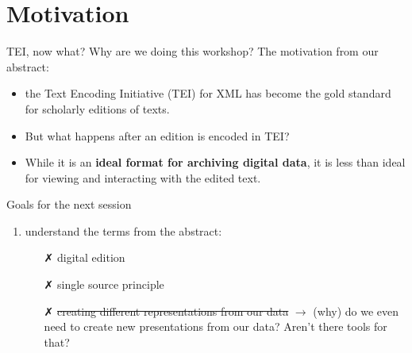 
\section{Motivation}

\begin{frame}{TEI, now what?}
    Why are we doing this workshop? The motivation from our abstract:
    \begin{itemize}
        \item \punkti the Text Encoding Initiative (TEI) for XML has become the gold standard for scholarly editions of texts.
        \item But what happens after an edition is encoded in TEI? 
        \item While it is an \textbf{ideal format for archiving digital data}, it is \alert{less than ideal for viewing and interacting with the edited text.}
    \end{itemize}
    
    \begin{block}{Goals for the next session}
    \begin{enumerate}
        \item understand the terms from the abstract:
        \begin{itemize}
            \item[\textcolor{alert}{\faClose}] digital edition
            \item[\textcolor{alert}{\faClose}] single source principle
            \item[\textcolor{alert}{\faClose}] \sout{creating different representations from our data} $\to$ (why) do we even need to create new presentations from our data? Aren't there tools for that?
        \end{itemize}
    \end{enumerate}
    \end{block}
\end{frame}

